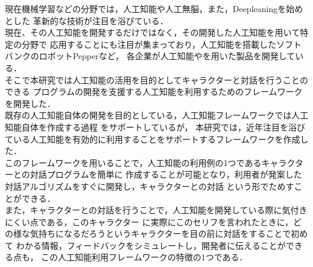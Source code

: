 %

現在機械学習などの分野では，人工知能や人工無脳，また，Deepleaningを始めとした
革新的な技術が注目を浴びている．
\\

現在、その人工知能を開発するだけではなく，その開発した人工知能を用いて特定の分野で
応用することにも注目が集まっており，人工知能を搭載したソフトバンクのロボットPepperなど，
各企業が人工知能やを用いた製品を開発している．
\\

そこで本研究では人工知能の活用を目的としてキャラクターと対話を行うことのできる
プログラムの開発を支援する人工知能を利用するためのフレームワークを開発した．
\\

既存の人工知能自体の開発を目的としている，人工知能フレームワークでは人工知能自体を作成する過程
をサポートしているが，
本研究では，近年注目を浴びている人工知能を有効的に利用することをサポートするフレームワークを作成した．
\\

このフレームワークを用いることで，人工知能の利用例の1つであるキャラクターとの対話プログラムを簡単に
作成することが可能となり，利用者が発案した対話アルゴリズムをすぐに開発し，キャラクターとの対話
という形でためすことができる．
\\

また，キャラクターとの対話を行うことで，人工知能を開発している際に気付きにくい点である，このキャラクター
に実際にこのセリフを言われたときに，どの様な気持ちになるだろうというキャラクターを目の前に対話をすることで初めて
わかる情報，フィードバックをシミュレートし，開発者に伝えることができる点も，
この人工知能利用フレームワークの特徴の1つである．